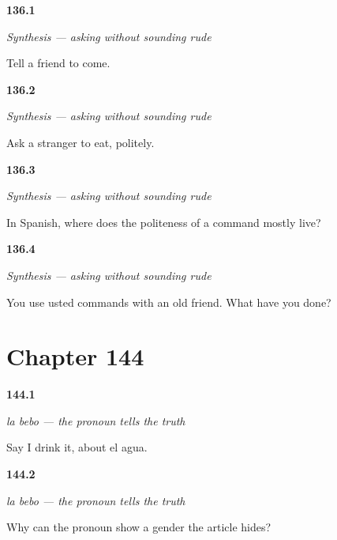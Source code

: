 \noindent\begin{minipage}[t]{\linewidth}
\raggedright
\hypertarget{review-ES-C50-sintesis-pedir-bien-friend}{\textbf{136.1}} \emph{Synthesis — asking without sounding rude}\par
\small Tell a friend to come.
\end{minipage}\par\medskip

\noindent\begin{minipage}[t]{\linewidth}
\raggedright
\hypertarget{review-ES-C50-sintesis-pedir-bien-stranger}{\textbf{136.2}} \emph{Synthesis — asking without sounding rude}\par
\small Ask a stranger to eat, politely.
\end{minipage}\par\medskip

\noindent\begin{minipage}[t]{\linewidth}
\raggedright
\hypertarget{review-ES-C50-sintesis-pedir-bien-where}{\textbf{136.3}} \emph{Synthesis — asking without sounding rude}\par
\small In Spanish, where does the politeness of a command mostly live?
\end{minipage}\par\medskip

\noindent\begin{minipage}[t]{\linewidth}
\raggedright
\hypertarget{review-ES-C50-sintesis-pedir-bien-mistake}{\textbf{136.4}} \emph{Synthesis — asking without sounding rude}\par
\small You use usted commands with an old friend. What have you done?
\end{minipage}\par\medskip

\section*{Chapter 144}

\noindent\begin{minipage}[t]{\linewidth}
\raggedright
\hypertarget{review-ES-C55-la-bebo-drink}{\textbf{144.1}} \emph{la bebo — the pronoun tells the truth}\par
\small Say I drink it, about el agua.
\end{minipage}\par\medskip

\noindent\begin{minipage}[t]{\linewidth}
\raggedright
\hypertarget{review-ES-C55-la-bebo-why}{\textbf{144.2}} \emph{la bebo — the pronoun tells the truth}\par
\small Why can the pronoun show a gender the article hides?
\end{minipage}\par\medskip

